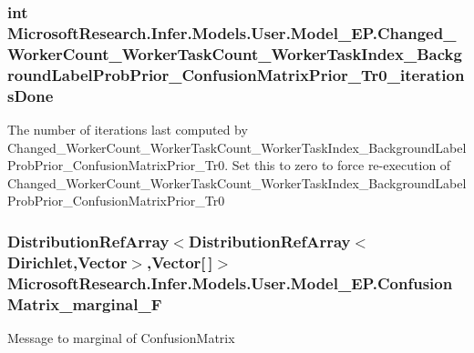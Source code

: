 \subsubsection[{Changed\+\_\+\+Worker\+Count\+\_\+\+Worker\+Task\+Count\+\_\+\+Worker\+Task\+Index\+\_\+\+Background\+Label\+Prob\+Prior\+\_\+\+Confusion\+Matrix\+Prior\+\_\+\+Tr0\+\_\+iterations\+Done}]{\setlength{\rightskip}{0pt plus 5cm}int Microsoft\+Research.\+Infer.\+Models.\+User.\+Model\+\_\+\+E\+P.\+Changed\+\_\+\+Worker\+Count\+\_\+\+Worker\+Task\+Count\+\_\+\+Worker\+Task\+Index\+\_\+\+Background\+Label\+Prob\+Prior\+\_\+\+Confusion\+Matrix\+Prior\+\_\+\+Tr0\+\_\+iterations\+Done}\label{class_microsoft_research_1_1_infer_1_1_models_1_1_user_1_1_model___e_p_a68cc9b27a065511a79d56f87983fc56d}


The number of iterations last computed by Changed\+\_\+\+Worker\+Count\+\_\+\+Worker\+Task\+Count\+\_\+\+Worker\+Task\+Index\+\_\+\+Background\+Label\+Prob\+Prior\+\_\+\+Confusion\+Matrix\+Prior\+\_\+\+Tr0. Set this to zero to force re-\/execution of Changed\+\_\+\+Worker\+Count\+\_\+\+Worker\+Task\+Count\+\_\+\+Worker\+Task\+Index\+\_\+\+Background\+Label\+Prob\+Prior\+\_\+\+Confusion\+Matrix\+Prior\+\_\+\+Tr0

\hypertarget{class_microsoft_research_1_1_infer_1_1_models_1_1_user_1_1_model___e_p_a826248ad56421c86f0f047e958f5fbce}{}
\subsubsection[{Confusion\+Matrix\+\_\+marginal\+\_\+\+F}]{\setlength{\rightskip}{0pt plus 5cm}Distribution\+Ref\+Array$<$Distribution\+Ref\+Array$<$Dirichlet,Vector$>$,Vector\mbox{[}$\,$\mbox{]}$>$ Microsoft\+Research.\+Infer.\+Models.\+User.\+Model\+\_\+\+E\+P.\+Confusion\+Matrix\+\_\+marginal\+\_\+\+F}\label{class_microsoft_research_1_1_infer_1_1_models_1_1_user_1_1_model___e_p_a826248ad56421c86f0f047e958f5fbce}


Message to marginal of \textquotesingle{}Confusion\+Matrix\textquotesingle{}

